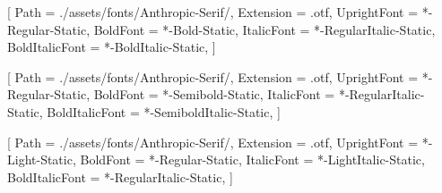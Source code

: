 \setmainfont{AnthropicSerif-Text}[
    Path = ./assets/fonts/Anthropic-Serif/,
    Extension = .otf,
    UprightFont = *-Regular-Static,
    BoldFont = *-Bold-Static,
    ItalicFont = *-RegularItalic-Static,
    BoldItalicFont = *-BoldItalic-Static,
]

[
    Path = ./assets/fonts/Anthropic-Serif/,
    Extension = .otf,
    UprightFont = *-Regular-Static,
    BoldFont = *-Semibold-Static,
    ItalicFont = *-RegularItalic-Static,
    BoldItalicFont = *-SemiboldItalic-Static,
]

[
    Path = ./assets/fonts/Anthropic-Serif/,
    Extension = .otf,
    UprightFont = *-Light-Static,
    BoldFont = *-Regular-Static,
    ItalicFont = *-LightItalic-Static,
    BoldItalicFont = *-RegularItalic-Static,
]
